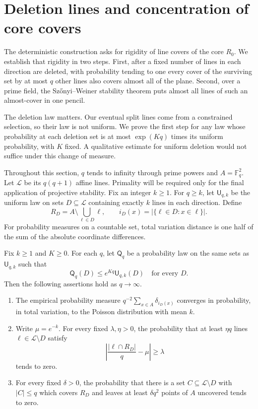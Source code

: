 \section{Deletion lines and concentration of core covers}
\label{sec:deletion}

The deterministic construction asks for rigidity of line covers of the
core $R_0$. We establish that rigidity in two steps. First, after a fixed
number of lines in each direction are deleted, with probability tending
to one every cover of the surviving set by at most $q$ other lines also
covers almost all of the plane. Second, over a prime field, the Sz\H{o}nyi--Weiner stability
theorem puts almost all lines of such an almost-cover in one pencil.

The deletion law matters. Our eventual split lines come from a constrained
selection, so their law is not uniform. We prove the first step for any
law whose probability at each deletion set is at most $\exp(Kq)$ times
its uniform probability, with $K$ fixed. A qualitative estimate for
uniform deletion would not suffice under this change of measure.

Throughout this section, $q$ tends to infinity through prime powers and
$A=\mathbb F_q^2$.  Let $\mathcal L$ be its $q(q+1)$ affine lines.  Primality
will be required only for the final application of projective stability.
Fix an integer $k\ge1$.  For $q\ge k$, let $\mathsf U_{q,k}$ be the uniform
law on sets $D\subseteq\mathcal L$ containing exactly $k$ lines in each
direction.  Define
\[
 R_D=A\setminus\bigcup_{\ell\in D}\ell,
 \qquad i_D(x)=|\{\ell\in D:x\in\ell\}|.
\]
For probability measures on a countable set, total variation distance is
one half of the sum of the absolute coordinate differences.

\begin{theorem}\label{thm:deletion}
Fix $k\ge1$ and $K\ge0$.  For each $q$, let $\mathsf Q_q$ be a probability
law on the same sets as $\mathsf U_{q,k}$ such that
\[
 \mathsf Q_q(D)\le e^{Kq}\mathsf U_{q,k}(D)
 \quad\text{for every }D.
\]
Then the following assertions hold as $q\to\infty$.
\begin{enumerate}[label=\textup{(\roman*)}]
\item The empirical probability measure
$q^{-2}\sum_{x\in A}\delta_{i_D(x)}$ converges in probability, in total
variation, to the Poisson distribution with mean $k$.
\item Write $\mu=e^{-k}$.  For every fixed $\lambda,\eta>0$, the probability
that at least $\eta q$ lines $\ell\in\mathcal L\setminus D$ satisfy
\[
 \left|\frac{|\ell\cap R_D|}{q}-\mu\right|\ge\lambda
\]
tends to zero.
\item For every fixed $\delta>0$, the probability that there is a set
$C\subseteq\mathcal L\setminus D$ with $|C|\le q$ which covers $R_D$ and
leaves at least $\delta q^2$ points of $A$ uncovered tends to zero.
\end{enumerate}
\end{theorem}


